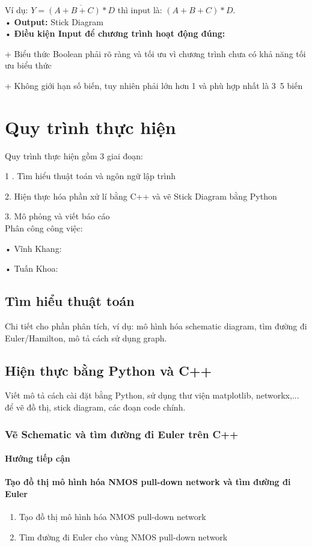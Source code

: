 \documentclass[a4paper,12pt]{article}
\begin{document}
Ví dụ: \( Y = \overline{(A + B + C) * D} \) thì input là: \( (A + B + C) * D \).\\
• \textbf{Output:} Stick Diagram\\
• \textbf{Điều kiện Input để chương trình hoạt động đúng:}

    + Biểu thức Boolean phải rõ ràng và tối ưu vì chương trình chưa có khả năng tối ưu biểu thức

    + Không giới hạn số biến, tuy nhiên phải lớn hơn 1 và phù hợp nhất là 3~5 biến
\newpage
\section{Quy trình thực hiện}
Quy trình thực hiện gồm 3 giai đoạn:

1 . Tìm hiểu thuật toán và ngôn ngữ lập trình

2. Hiện thực hóa phần xử lí bằng C++ và vẽ Stick Diagram bằng Python

3. Mô phỏng và viết báo cáo\\
Phân công công việc:

• Vĩnh Khang:

• Tuấn Khoa: 
\subsection{Tìm hiểu thuật toán}
Chi tiết cho phần phân tích, ví dụ: mô hình hóa schematic diagram, tìm đường đi Euler/Hamilton, mô tả cách sử dụng graph.
\subsection{Hiện thực bằng Python và C++}
Viết mô tả cách cài đặt bằng Python, sử dụng thư viện matplotlib, networkx,... để vẽ đồ thị, stick diagram, các đoạn code chính.
\subsubsection{Vẽ Schematic và tìm đường đi Euler trên C++}
\paragraph{Hướng tiếp cận}
\paragraph{Tạo đồ thị mô hình hóa NMOS pull-down network và tìm đường đi Euler}
\begin{enumerate}[label=\alph*.]
    \item{Tạo đồ thị mô hình hóa NMOS pull-down network}
    \item{Tìm đường đi Euler cho vùng NMOS pull-down network}
\end{enumerate}
\end{document}
